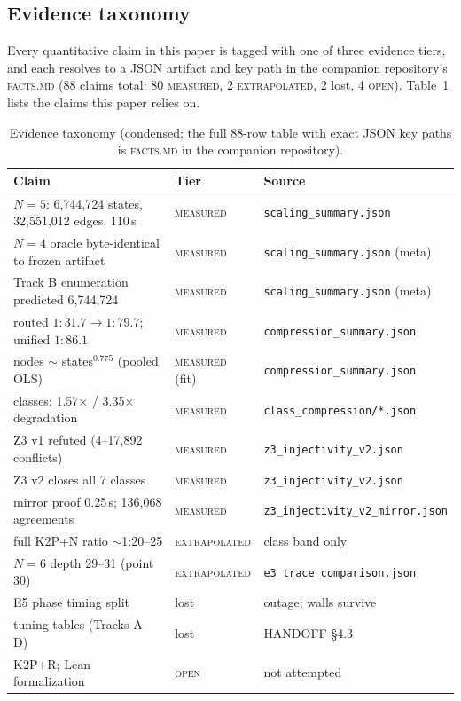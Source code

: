 \documentclass[conference]{IEEEtran}
\newcommand{\tierm}{\textsc{measured}}
\newcommand{\tiere}{\textsc{extrapolated}}
\newcommand{\iero}{\textsc{open}}
\begin{document}
\subsection{Evidence taxonomy}
\label{sec:taxonomy}
Every quantitative claim in this paper is tagged with one of three evidence
tiers, and each resolves to a JSON artifact and key path in the
companion repository's \textsc{facts.md} (88 claims total: 80
\tierm{}, 2 \tiere{}, 2 lost, 4 \iero{}). Table~\ref{tab:taxonomy} lists the
claims this paper relies on.
\begin{table}[t]
\caption{Evidence taxonomy (condensed; the full 88-row table with exact
JSON key paths is \textsc{facts.md} in the companion repository).}
\label{tab:taxonomy}
\centering
\scriptsize
\begin{tabular}{p{3.2cm}p{1.45cm}p{2.4cm}}
\toprule
Claim & Tier & Source \\
\midrule
$N{=}5$: 6{,}744{,}724 states, 32{,}551{,}012 edges, 110\,s & \tierm{} & \texttt{scaling\_\allowbreak summary.json} \\
$N{=}4$ oracle byte-identical to frozen artifact & \tierm{} & \texttt{scaling\_\allowbreak summary.json} (meta) \\
Track B enumeration predicted 6{,}744{,}724 & \tierm{} & \texttt{scaling\_\allowbreak summary.json} (meta) \\
routed $1{:}31.7 \to 1{:}79.7$; unified $1{:}86.1$ & \tierm{} & \texttt{compression\_\allowbreak summary.json} \\
nodes $\sim$ states$^{0.775}$ (pooled OLS) & \tierm{} (fit) & \texttt{compression\_\allowbreak summary.json} \\
classes: 1.57$\times$ / 3.35$\times$ degradation & \tierm{} & \texttt{class\_\allowbreak compression/*.json} \\
Z3 v1 refuted (4--17{,}892 conflicts) & \tierm{} & \texttt{z3\_\allowbreak injectivity\_\allowbreak v2.json} \\
Z3 v2 closes all 7 classes & \tierm{} & \texttt{z3\_\allowbreak injectivity\_\allowbreak v2.json} \\
mirror proof 0.25\,s; 136{,}068 agreements & \tierm{} & \texttt{z3\_\allowbreak injectivity\_\allowbreak v2\_\allowbreak mirror.json} \\
full K2P+N ratio $\sim$1:20--25 & \tiere{} & class band only \\
$N{=}6$ depth 29--31 (point 30) & \tiere{} & \texttt{e3\_\allowbreak trace\_\allowbreak comparison.json} \\
E5 phase timing split & lost & outage; walls survive \\
tuning tables (Tracks A--D) & lost & HANDOFF \S4.3 \\
K2P+R; Lean formalization & \iero{} & not attempted \\
\bottomrule
\end{tabular}
\end{table}
\end{document}
